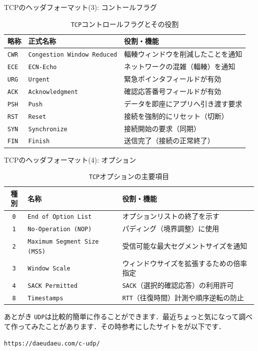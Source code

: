 \documentclass[unicode,11pt,aspectratio=169]{beamer}
\begin{document}
\begin{frame}{TCPのヘッダフォーマット(3): コントールフラグ}
  \begin{table}[h]
    \centering
    \caption{\texttt{TCP}コントロールフラグとその役割}
    \small %
    \begin{tabular}{|l|l|l|}
        \hline
        \textbf{略称} & \textbf{正式名称} & \textbf{役割・機能} \\ \hline
        \texttt{CWR} & \texttt{Congestion Window Reduced} & 輻輳ウィンドウを削減したことを通知 \\ \hline
        \texttt{ECE} & \texttt{ECN-Echo} & ネットワークの混雑（輻輳）を通知 \\ \hline
        \texttt{URG} & \texttt{Urgent} & 緊急ポインタフィールドが有効 \\ \hline
        \texttt{ACK} & \texttt{Acknowledgment} & 確認応答番号フィールドが有効 \\ \hline
        \texttt{PSH} & \texttt{Push} & データを即座にアプリへ引き渡す要求 \\ \hline
        \texttt{RST} & \texttt{Reset} & 接続を強制的にリセット（切断） \\ \hline
        \texttt{SYN} & \texttt{Synchronize} & 接続開始の要求（同期） \\ \hline
        \texttt{FIN} & \texttt{Finish} & 送信完了（接続の正常終了） \\ \hline
    \end{tabular}
  \end{table}
\end{frame}

\begin{frame}{TCPのヘッダフォーマット(4): オプション}
  \begin{table}[h]
    \centering
    \caption{\texttt{TCP}オプションの主要項目}
    \footnotesize %
    \begin{tabular}{|c|l|l|}
        \hline
        \textbf{種別} & \textbf{名称} & \textbf{役割・機能} \\ \hline
        \texttt{0} & \texttt{End of Option List} & オプションリストの終了を示す \\ \hline
        \texttt{1} & \texttt{No-Operation (NOP)} & パディング（境界調整）に使用 \\ \hline
        \texttt{2} & \texttt{Maximum Segment Size (MSS)} & 受信可能な最大セグメントサイズを通知 \\ \hline
        \texttt{3} & \texttt{Window Scale} & ウィンドウサイズを拡張するための倍率指定 \\ \hline
        \texttt{4} & \texttt{SACK Permitted} & \texttt{SACK}（選択的確認応答）の利用許可 \\ \hline
        \texttt{8} & \texttt{Timestamps} & \texttt{RTT}（往復時間）計測や順序逆転の防止 \\ \hline
    \end{tabular}
  \end{table}
\end{frame}

\begin{frame}{あとがき}
  \texttt{UDP}は比較的簡単に作ることができます．最近ちょっと気になって調べて作ってみたことがあります．その時参考にしたサイトをが以下です．

  \texttt{https://daeudaeu.com/c-udp/}
\end{frame}
\end{document}
